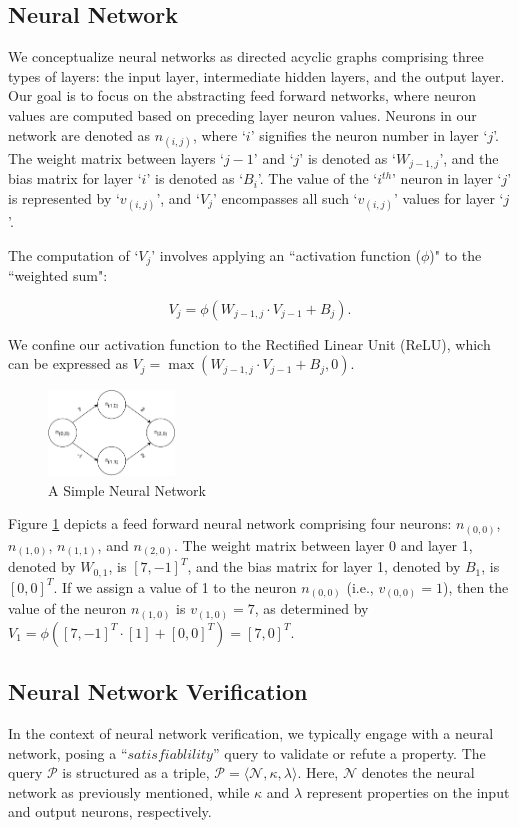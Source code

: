 \subsection{Neural Network}
We conceptualize neural networks as directed acyclic graphs 
comprising three types of layers: the input layer, intermediate hidden layers, 
and the output layer. Our goal is to focus on the abstracting feed forward networks, 
where neuron values are computed based on preceding layer neuron values. 
Neurons in our network are denoted as $n_{(i,j)}$, where `$i$' signifies the 
neuron number in layer `$j$'. The weight matrix between layers `${j-1}$' and `$j$' 
is denoted as `$W_{{j-1}, j}$', and the bias matrix for layer `$i$' is denoted as 
`$B_{i}$'. The value of the `$i^{th}$' neuron in layer `$j$' is represented by 
`$v_{(i,j)}$', and `$V_{j}$' encompasses all such `$v_{(i,j)}$' values for layer 
`$j$'.

The computation of `$V_{j}$' involves applying an ``activation function ($\phi$)" 
to the ``weighted sum":

\[V_{j} = \phi(W_{{j-1}, j} \cdot V_{j-1} + B_{j}).\] 

We confine our activation function to the Rectified Linear Unit (ReLU), 
which can be expressed as $V_{j} = \max(W_{j-1, j} \cdot V_{j-1} + B_{j}, 0)$.


\begin{figure}[H]
    \centering
    \includegraphics[width=0.3\textwidth, height = 0.15\textwidth]{diagrams/Basic_Neural_Network.pdf}
    \caption{A Simple Neural Network}
    \label{Figure: Simple Neurla}

\end{figure} 

Figure \ref{Figure: Simple Neurla} depicts a feed forward neural network 
comprising four neurons: $n_{(0, 0)}$, $n_{(1, 0)}$, $n_{(1, 1)}$, and $n_{(2, 0)}$. 
The weight matrix between layer 0 and layer 1, denoted by $W_{0,1}$, 
is $[7, -1]^T$, and the bias matrix for layer 1, denoted by $B_{1}$, 
is $[0, 0]^T$. If we assign a value of 1 to the neuron $n_{(0, 0)}$ 
(i.e., $v_{(0, 0)}=1$), then the value of the neuron $n_{(1,0)}$ is $v_{(1,0)}=7$, 
as determined by $V_{1} = \phi([7, -1]^{T} \cdot [1] + [0, 0]^{T}) = [7, 0]^{T}$.


\subsection{Neural Network Verification }
In the context of neural network verification, we typically engage with a
 neural network, posing a ``$\textit{satisfiablility}$'' query to validate or 
 refute a property. The query \(\mathcal{P}\) is structured as a triple,
  \(\mathcal{P} = \langle \mathcal{N}, \kappa, \lambda \rangle\). Here,
   \(\mathcal{N}\) denotes the neural network as previously mentioned, 
   while \(\kappa\) and \(\lambda\) represent properties on the input and 
   output neurons, respectively. 

